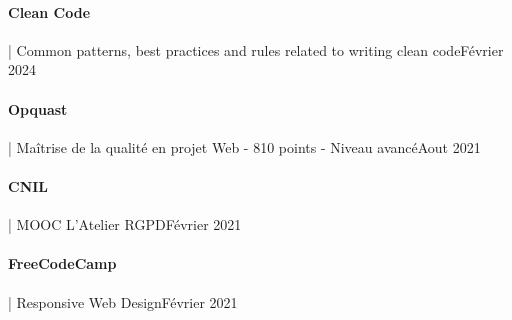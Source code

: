\documentclass{article}
\begin{document}
\paragraph{Clean Code} | Common patterns, best practices and rules related to writing clean code\hspace*{\fill}Février 2024
\paragraph{Opquast} | Maîtrise de la qualité en projet Web - 810 points - Niveau avancé\hspace*{\fill}Aout 2021
\paragraph{CNIL} | MOOC L'Atelier RGPD\hspace*{\fill}Février 2021
\paragraph{FreeCodeCamp} | Responsive Web Design\hspace*{\fill}Février 2021
\end{document}
